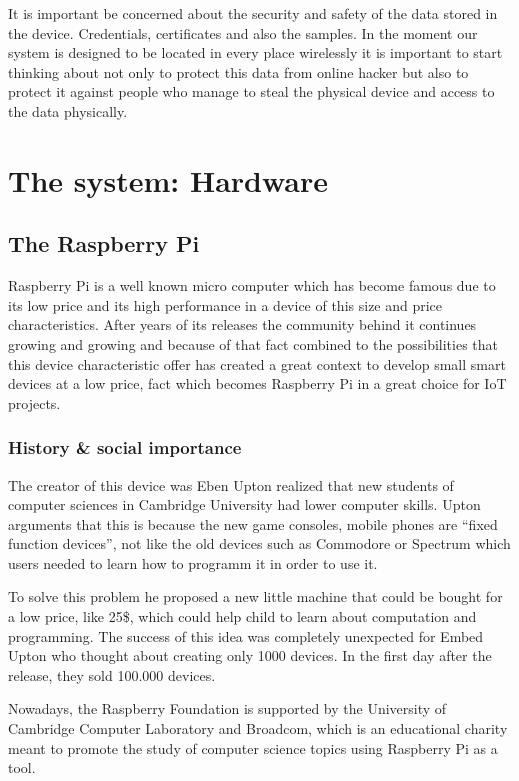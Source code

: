 	It is important be concerned about the security and safety of the data stored in the device. Credentials, certificates and also the samples. In the moment our system is designed to be located in every place wirelessly it is important to start thinking about not only to protect this data from online hacker but also to protect it against people who manage to steal the physical device and access to the data physically.

\chapter{The system: Hardware}
	\section{The Raspberry Pi} %
	Raspberry Pi is a well known micro computer which has become famous due to its low price and its high performance in a device of this size and price characteristics. After years of its releases the community behind it continues growing and growing and because of that fact combined to the possibilities that this device characteristic offer has created a great context to develop small smart devices at a low price, fact which becomes Raspberry Pi in a great choice for IoT projects.

		\subsection{History \& social importance}
		The creator of this device was Eben Upton realized that new students of computer sciences in Cambridge University had lower computer skills. Upton arguments that this is because the new game consoles, mobile phones are ``fixed function devices'', not like the old devices such as Commodore or Spectrum which users needed to learn how to programm it in order to use it.

		To solve this problem he proposed a new little machine that could be bought for a low price, like 25\$, which could help child to learn about computation and programming. The success of this idea was completely unexpected for Embed Upton who thought about creating only 1000 devices. In the first day after the release, they sold 100.000 devices.

		Nowadays, the Raspberry Foundation is supported by the University of Cambridge Computer Laboratory and Broadcom, which is an educational charity meant to promote the study of computer science topics using Raspberry Pi as a tool.

